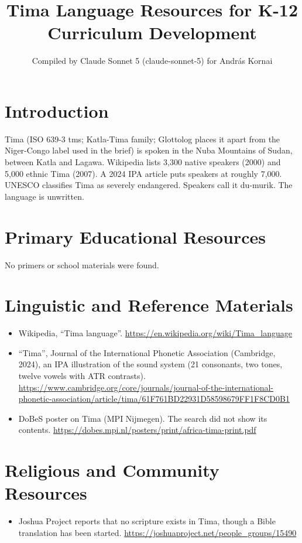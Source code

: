 \documentclass[12pt]{article}
\title{Tima Language Resources for K-12 Curriculum Development}
\author{Compiled by Claude Sonnet 5 (claude-sonnet-5) for Andr\'as Kornai}
\date{}
\begin{document}
\maketitle

\section{Introduction}
Tima (ISO 639-3 tms; Katla-Tima family; Glottolog places it apart from the Niger-Congo label used in the brief) is spoken in the Nuba Mountains of Sudan, between Katla and Lagawa. Wikipedia lists 3,300 native speakers (2000) and 5,000 ethnic Tima (2007). A 2024 IPA article puts speakers at roughly 7,000. UNESCO classifies Tima as severely endangered. Speakers call it du-murik. The language is unwritten.

\section{Primary Educational Resources}
No primers or school materials were found.

\section{Linguistic and Reference Materials}
\begin{itemize}
\item Wikipedia, ``Tima language''. \url{https://en.wikipedia.org/wiki/Tima_language}
\item ``Tima'', Journal of the International Phonetic Association (Cambridge, 2024), an IPA illustration of the sound system (21 consonants, two tones, twelve vowels with ATR contrasts). \url{https://www.cambridge.org/core/journals/journal-of-the-international-phonetic-association/article/tima/61F761BD22931D58598679FF1F8CD0B1}
\item DoBeS poster on Tima (MPI Nijmegen). The search did not show its contents. \url{https://dobes.mpi.nl/posters/print/africa-tima-print.pdf}
\end{itemize}

\section{Religious and Community Resources}
\begin{itemize}
\item Joshua Project reports that no scripture exists in Tima, though a Bible translation has been started. \url{https://joshuaproject.net/people_groups/15490}
\end{itemize}
\end{document}
